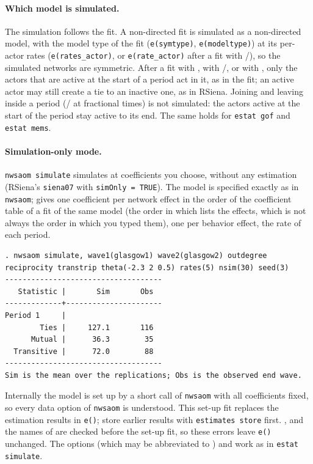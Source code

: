 \paragraph{Which model is simulated.} The simulation follows the fit. A non-directed fit is simulated as a non-directed model, with the model type of the fit (\texttt{e(symtype)}, \texttt{e(modeltype)}) at its per-actor rates (\texttt{e(rates\_actor)}, or \texttt{e(rate\_actor)} after a fit with /), so the simulated networks are symmetric. After a fit with , with /, or with , only the actors that are active at the start of a period act in it, as in the fit; an active actor may still create a tie to an inactive one, as in RSiena. Joining and leaving inside a period (/ at fractional times) is not simulated: the actors active at the start of the period stay active to its end. The same holds for \texttt{estat gof} and \texttt{estat mems}.

\paragraph{Simulation-only mode.} \texttt{nwsaom simulate} simulates at coefficients you choose, without any estimation (RSiena's \texttt{siena07} with \texttt{simOnly = TRUE}). The model is specified exactly as in \texttt{nwsaom};  gives one coefficient per network effect in the order of the coefficient table of a fit of the same model (the order in which \nwsaom{} lists the effects, which is not always the order in which you typed them),  one per behavior effect,  the rate of each period.
\begin{lstlisting}
. nwsaom simulate, wave1(glasgow1) wave2(glasgow2) outdegree reciprocity transtrip theta(-2.3 2 0.5) rates(5) nsim(30) seed(3)
------------------------------------
   Statistic |       Sim       Obs
-------------+----------------------
Period 1     |
        Ties |     127.1       116
      Mutual |      36.3        35
  Transitive |      72.0        88
------------------------------------
Sim is the mean over the replications; Obs is the observed end wave.
\end{lstlisting}
Internally the model is set up by a short call of \texttt{nwsaom} with all coefficients fixed, so every data option of \texttt{nwsaom} is understood. This set-up fit replaces the estimation results in \texttt{e()}; store earlier results with \texttt{estimates store} first. ,  and the names of  are checked before the set-up fit, so these errors leave \texttt{e()} unchanged. The options  (which may be abbreviated to ) and  work as in \texttt{estat simulate}.

